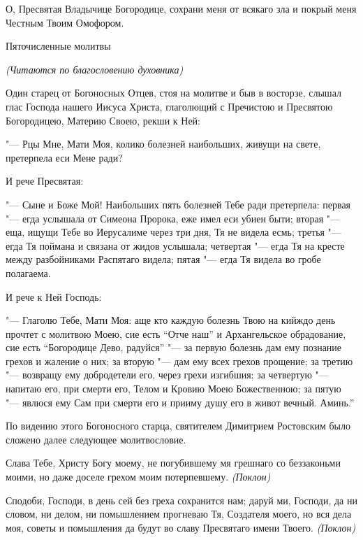 \normalfont{}О, Пресвятая Владычице Богородице, сохрани меня от всякаго зла и покрый меня Честным Твоим Омофором.
\mychapterending

 

Пяточисленные молитвы 

\itshape (Читаются по благословению духовника)\normalfont{}




Один старец от Богоносных Отцев, стоя на молитве и быв в восторзе, слышал глас Господа нашего Иисуса Христа, глаголющий с Пречистою и Пресвятою Богородицею, Материю Своею, рекши к Ней: 


"--- Рцы Мне, Мати Моя, колико болезней наибольших, живущи на свете, претерпела еси Мене ради?


И рече Пресвятая:


"--- Сыне и Боже Мой! Наибольших пять болезней Тебе ради претерпела: первая "--- егда услышала от Симеона Пророка, еже имел еси убиен быти; вторая "--- еща, ищущи Тебе во Иерусалиме через три дня, Тя не видела есмь; третья "--- егда Тя поймана и связана от жидов услышала; четвертая "--- егда Тя на кресте между разбойниками Распятаго видела; пятая "--- егда Тя видела во гробе полагаема.


И рече к Ней Господь:


"--- Глаголю Тебе, Мати Моя: аще кто каждую болезнь Твою на кийждо день прочтет с молитвою Моею, сие есть “Отче наш” и Архангельское обрадование, сие есть “Богородице Дево, радуйся” "--- за первую болезнь дам ему познание грехов и жаление о них; за вторую "--- дам ему всех грехов прощение; за третию "--- возвращу ему добродетели его, через грехи изгибшия; за четвертую "--- напитаю его, при смерти его, Телом и Кровию Моею Божественною; за пятую "--- явлюся ему Сам при смерти его и прииму душу его в живот вечный. Аминь.”


По видению этого Богоносного старца, святителем Димитрием Ростовским было сложено далее следующее молитвословие.




Слава Тебе, Христу Богу моему, не погубившему мя грешнаго со беззаконьми моими, но даже доселе грехом моим потерпевшему. \itshape (Поклон)

\normalfont{}Сподоби, Господи, в день сей без греха сохранится нам; даруй ми, Господи, да ни словом, ни делом, ни помышлением прогневаю Тя, Создателя моего, но вся дела моя, советы и помышления да будут во славу Пресвятаго имени Твоего. \itshape (Поклон)

